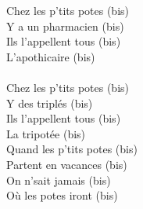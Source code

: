 Chez les p’tits potes (bis)\\
Y a un pharmacien (bis)\\
Ils l’appellent tous (bis)\\
L’apothicaire (bis)\\\\
Chez les p’tits potes (bis)\\
Y des triplés (bis)\\
Ils l’appellent tous (bis)\\
La tripotée (bis)\\
Quand les p’tits potes (bis)\\
Partent en vacances (bis)\\
On n’sait jamais (bis)\\
Où les potes iront (bis)\\
